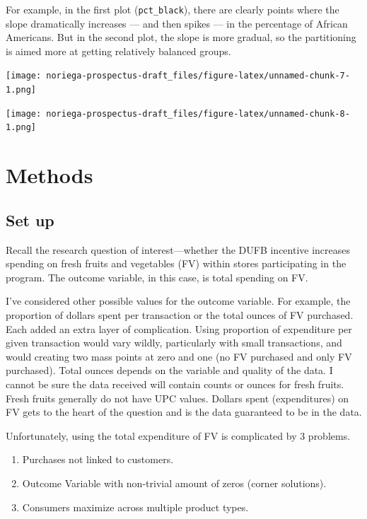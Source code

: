 \documentclass[12pt,letterpaperpaper,]{book}
\providecommand{\tightlist}{%
  \setlength{\itemsep}{0pt}\setlength{\parskip}{0pt}}
\begin{document}
For example, in the first plot (\texttt{pct\_black}), there are clearly
points where the slope dramatically increases --- and then spikes --- in
the percentage of African Americans. But in the second plot, the slope
is more gradual, so the partitioning is aimed more at getting relatively
balanced groups.

\texttt{[image: noriega-prospectus-draft\_files/figure-latex/unnamed-chunk-7-1.png]}

\texttt{[image: noriega-prospectus-draft\_files/figure-latex/unnamed-chunk-8-1.png]}

\hypertarget{methods-1}{\section*{Methods}\label{methods-1}}

\subsection*{Set up}\label{set-up}

Recall the research question of interest---whether the DUFB incentive
increases spending on fresh fruits and vegetables (FV) within stores
participating in the program. The outcome variable, in this case, is
total spending on FV.

I've considered other possible values for the outcome variable. For
example, the proportion of dollars spent per transaction or the total
ounces of FV purchased. Each added an extra layer of complication. Using
proportion of expenditure per given transaction would vary wildly,
particularly with small transactions, and would creating two mass points
at zero and one (no FV purchased and only FV purchased). Total ounces
depends on the variable and quality of the data. I cannot be sure the
data received will contain counts or ounces for fresh fruits. Fresh
fruits generally do not have UPC values. Dollars spent (expenditures) on
FV gets to the heart of the question and is the data guaranteed to be in
the data.

Unfortunately, using the total expenditure of FV is complicated by 3
problems.

\begin{enumerate}
\def\labelenumi{\arabic{enumi}.}
\tightlist
\item
  Purchases not linked to customers.
\item
  Outcome Variable with non-trivial amount of zeros (corner solutions).
\item
  Consumers maximize across multiple product types.
\end{enumerate}
\end{document}

